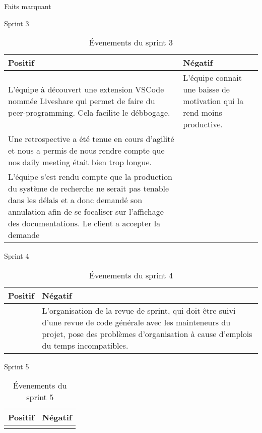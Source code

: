 \documentclass[]{article}
\begin{document}
{\begin{section}{Faits marquant}
    \begin{subsection}{Sprint 3}
        \begin{table}[H]
            \caption{Évenements du sprint 3}
            \begin{tabularx}{\columnwidth}{|X|X|}
                \hline
                \cellcolor[HTML]{17FF00}Positif & \cellcolor[HTML]{FF2D00}Négatif\\
                \hline
                L'équipe à découvert une extension VSCode nommée Liveshare qui permet de faire du peer-programming. Cela facilite le débbogage. & L'équipe connait une baisse de motivation qui la rend moins productive. \\
                \hline
                Une retrospective a été tenue en cours d'agilité et nous a permis de nous rendre compte que nos daily meeting était bien trop longue. & \\
                \hline
                L'équipe s'est rendu compte que la production du système de recherche ne serait pas tenable dans les délais et a donc demandé son annulation afin de se focaliser sur l'affichage des documentations. Le client a accepter la demande & \\
                \hline
            \end{tabularx}
        \end{table}
    \end{subsection}

    \begin{subsection}{Sprint 4}
        \begin{table}[H]
            \caption{Évenements du sprint 4}
            \begin{tabularx}{\columnwidth}{|X|X|}
                \hline
                \cellcolor[HTML]{17FF00}Positif & \cellcolor[HTML]{FF2D00}Négatif\\
                \hline
                 & L'organisation de la revue de sprint, qui doit être suivi d'une revue de code générale avec les mainteneurs du projet, pose des problèmes d'organisation à cause d'emplois du temps incompatibles. \\
                \hline
            \end{tabularx}
        \end{table}
    \end{subsection}

    \begin{subsection}{Sprint 5}
        \begin{table}[H]
            \caption{Évenements du sprint 5}
            \begin{tabularx}{\columnwidth}{|X|X|}
                \hline
                \cellcolor[HTML]{17FF00}Positif & \cellcolor[HTML]{FF2D00}Négatif\\
                \hline
                 & \\
                \hline
            \end{tabularx}
        \end{table}
    \end{subsection}


\end{section}}
\end{document}
